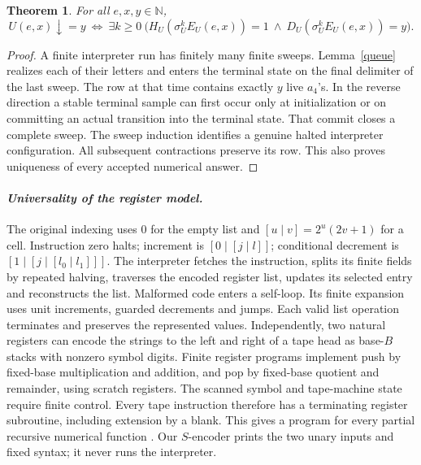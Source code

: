 \documentclass[11pt,letterpaper,oneside,reqno]{amsart}
\newtheorem{theorem}{Theorem}
\newcommand{\N}{\mathbb N}
\begin{document}
\begin{theorem}\label{output}
For all \(e,x,y\in\N\),
\[
 U(e,x)\downarrow=y\ \iff\
 \exists k\ge0\ \bigl(H_U(\sigma_U^k E_U(e,x))=1\ \land\
                      D_U(\sigma_U^k E_U(e,x))=y\bigr).
\]
\end{theorem}
\begin{proof}
A finite interpreter run has finitely many finite sweeps. Lemma~\ref{queue} realizes each of their letters and enters the terminal state on the final delimiter of the last sweep. The row at that time contains exactly \(y\) live \(a_4\)'s. In the reverse direction a stable terminal sample can first occur only at initialization or on committing an actual transition into the terminal state. That commit closes a complete sweep. The sweep induction identifies a genuine halted interpreter configuration. All subsequent contractions preserve its row. This also proves uniqueness of every accepted numerical answer.
\end{proof}

\paragraph{\textit{Universality of the register model.}}
The original indexing uses \(0\) for the empty list and \([u\mid v]=2^u(2v+1)\) for a cell. Instruction zero halts; increment is \([0\mid[j\mid l]]\); conditional decrement is \([1\mid[j\mid[l_0\mid l_1]]]\). The interpreter fetches the instruction, splits its finite fields by repeated halving, traverses the encoded register list, updates its selected entry and reconstructs the list. Malformed code enters a self-loop. Its finite expansion uses unit increments, guarded decrements and jumps. Each valid list operation terminates and preserves the represented values. Independently, two natural registers can encode the strings to the left and right of a tape head as base-\(B\) stacks with nonzero symbol digits. Finite register programs implement push by fixed-base multiplication and addition, and pop by fixed-base quotient and remainder, using scratch registers. The scanned symbol and tape-machine state require finite control. Every tape instruction therefore has a terminating register subroutine, including extension by a blank. This gives a program for every partial recursive numerical function \cite{register}. Our \(S\)-encoder prints the two unary inputs and fixed syntax; it never runs the interpreter.



\end{document}

